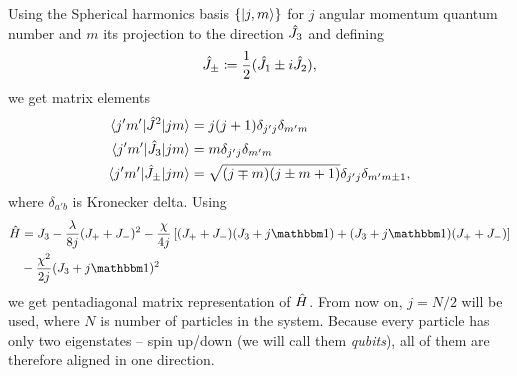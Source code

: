Using the Spherical harmonics basis $\{\ket{j,m}\}$ for $j$ angular momentum quantum number and $m$ its projection to the direction $\hat{J}_3$ and defining
\begin{equation}
    \hat{J}_\pm\coloneqq\frac{1}{2}(\hat{J}_1\pm i\hat{J}_2),
\end{equation}
we get matrix elements
\begin{align}
    \braket{j'm'|\hat{J}^2|jm} &= j(j+1)\delta_{j'j}\delta_{m'm}\\
    \braket{j'm'|\hat{J}_3|jm} &= m \delta_{j'j}\delta_{m'm}\\
    \braket{j'm'|\hat{J}_\pm|jm} &= \sqrt{(j\mp m)(j\pm m+1)}\delta_{j'j}\delta_{m'm\pm 1},
\end{align}
where $\delta_{a'b}$ is Kronecker delta. Using
\begin{equation}
\begin{split}
        \HH &= J_3-\frac{\lambda}{8j}(J_++J_-)^2-\frac{\chi}{4j}\left[(J_++J_-)(J_3+j\Id)+(J_3+j\Id)(J_++J_-)\right]\\
        &-\frac{\chi^2}{2j}(J_3+j\Id)^2
\end{split}
\end{equation}
we get pentadiagonal matrix representation of $\hat{H}$. 
From now on, $j=N/2$ will be used, where $N$ is number of particles in the system. Because every particle has only two eigenstates -- spin up/down (we will call them \emph{qubits}), all of them are therefore aligned in one direction.


